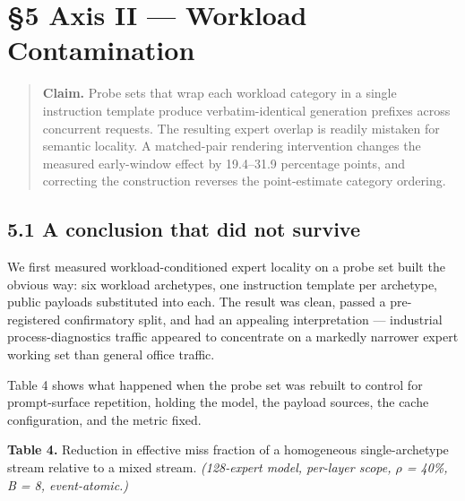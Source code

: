 \documentclass[
  10pt,
  letterpaper,
  10pt]{article}
\begin{document}
\section{§5 Axis II --- Workload
Contamination}\label{axis-ii-workload-contamination}

\begin{quote}
\textbf{Claim.} Probe sets that wrap each workload category in a single
instruction template produce verbatim-identical generation prefixes
across concurrent requests. The resulting expert overlap is readily
mistaken for semantic locality. A matched-pair rendering intervention
changes the measured early-window effect by 19.4--31.9 percentage
points, and correcting the construction reverses the point-estimate
category ordering.
\end{quote}

\subsection{5.1 A conclusion that did not
survive}\label{a-conclusion-that-did-not-survive}

We first measured workload-conditioned expert locality on a probe set
built the obvious way: six workload archetypes, one instruction template
per archetype, public payloads substituted into each. The result was
clean, passed a pre-registered confirmatory split, and had an appealing
interpretation --- industrial process-diagnostics traffic appeared to
concentrate on a markedly narrower expert working set than general
office traffic.

Table 4 shows what happened when the probe set was rebuilt to control
for prompt-surface repetition, holding the model, the payload sources,
the cache configuration, and the metric fixed.

\textbf{Table 4.} Reduction in effective miss fraction of a homogeneous
single-archetype stream relative to a mixed stream. \emph{(128-expert
model, per-layer scope, \ensuremath{\rho} = 40\%, B = 8, event-atomic.)}
\end{document}
